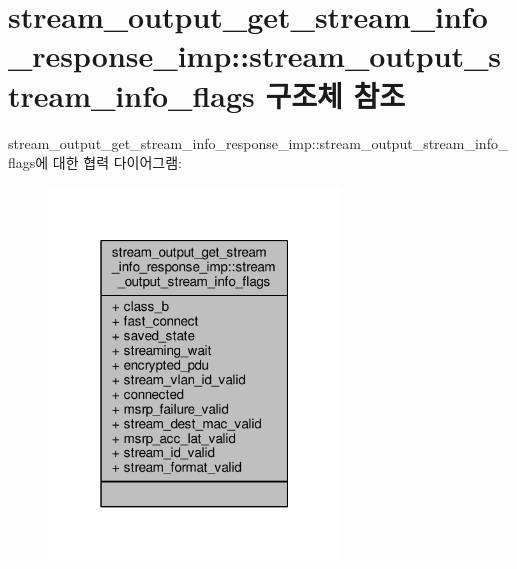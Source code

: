\hypertarget{structavdecc__lib_1_1stream__output__get__stream__info__response__imp_1_1stream__output__stream__info__flags}{}\section{stream\+\_\+output\+\_\+get\+\_\+stream\+\_\+info\+\_\+response\+\_\+imp\+:\+:stream\+\_\+output\+\_\+stream\+\_\+info\+\_\+flags 구조체 참조}
\label{structavdecc__lib_1_1stream__output__get__stream__info__response__imp_1_1stream__output__stream__info__flags}


stream\+\_\+output\+\_\+get\+\_\+stream\+\_\+info\+\_\+response\+\_\+imp\+:\+:stream\+\_\+output\+\_\+stream\+\_\+info\+\_\+flags에 대한 협력 다이어그램\+:
\nopagebreak
\begin{figure}[H]
\begin{center}
\leavevmode
\includegraphics[width=220pt]{structavdecc__lib_1_1stream__output__get__stream__info__response__imp_1_1stream__output__stream__info__flags__coll__graph}
\end{center}
\end{figure}
